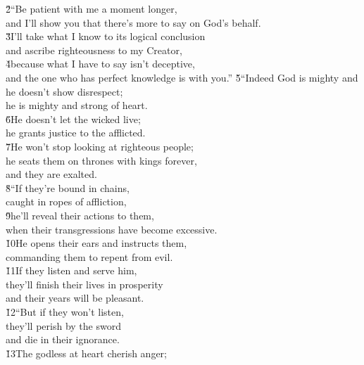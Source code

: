 \begin{poetry}
\poeml \v{2}``Be patient with me a moment longer, \\
\poemll    and I'll show you that there's more to say on God's behalf. \\
\poeml \v{3}I'll take what I know to its logical conclusion \\
\poemll    and ascribe righteousness to my Creator, \\
\poeml \v{4}because what I have to say isn't deceptive, \\
\poemll    and the one who has perfect knowledge is with you.''
\poeml \v{5}``Indeed God is mighty and he doesn't show disrespect; \\
\poemll    he is mighty and strong of heart. \\
\poeml \v{6}He doesn't let the wicked live; \\
\poemll    he grants justice to the afflicted. \\
\poeml \v{7}He won't stop looking at righteous people; \\
\poemll    he seats them on thrones with kings forever, \\
\poemlll       and they are exalted. \\
\poeml \v{8}``If they're bound in chains, \\
\poemll    caught in ropes of affliction, \\
\poeml \v{9}he'll reveal their actions to them, \\
\poemll    when their transgressions have become excessive. \\
\poeml \v{10}He opens their ears and instructs them, \\
\poemll    commanding them to repent from evil. \\
\poeml \v{11}If they listen and serve him, \\
\poemll    they'll finish their lives in prosperity \\
\poemlll       and their years will be pleasant. \\
\poeml \v{12}``But if they won't listen, \\
\poemll    they'll perish by the sword \\
\poemlll       and die in their ignorance. \\
\poeml \v{13}The godless at heart cherish anger; \\

\end{poetry}
